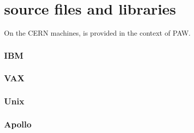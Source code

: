 
\chapter{\COMIS{} source files and libraries}
 
On the CERN machines, \COMIS{} is provided in the context of PAW.

\subsection*{IBM}

\begin{alltt} 
\end{alltt} 

\subsection*{VAX}
 
\begin{alltt}
\end{alltt}

\subsection*{Unix}
 
\begin{alltt}
\end{alltt}

\subsection*{Apollo}
 
\begin{alltt}
\end{alltt}
